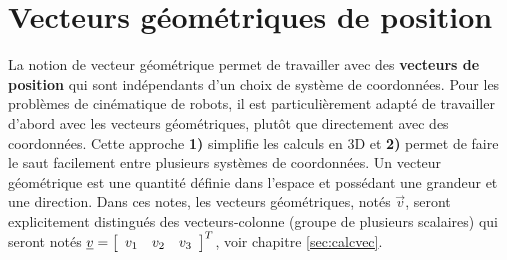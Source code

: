 %





\newpage
\section{Vecteurs géométriques de position}
\label{sec:vecgeopos}

La notion de vecteur géométrique permet de travailler avec des \textbf{vecteurs de position} qui sont indépendants d'un choix de système de coordonnées. Pour les problèmes de cinématique de robots, il est particulièrement adapté de travailler d'abord avec les vecteurs géométriques, plutôt que directement avec des coordonnées. Cette approche \textbf{1)} simplifie les calculs en 3D et \textbf{2)} permet de faire le saut facilement entre plusieurs systèmes de coordonnées. Un vecteur géométrique est une quantité définie dans l’espace et possédant une grandeur et une direction. Dans ces notes, les vecteurs géométriques, notés $\vec{v}$, seront explicitement distingués des vecteurs-colonne (groupe de plusieurs scalaires) qui seront notés $\underline{v}=\left[  \begin{array}{ccc} v_{1} & v_{2} & v_{3} \end{array} \right]^T$, voir chapitre \ref{sec:calcvec}.



